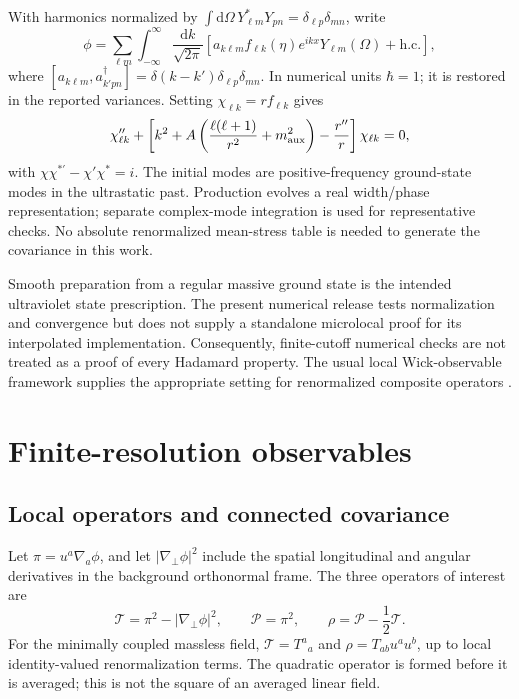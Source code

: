 \documentclass[aps,prd,reprint,floatfix,nofootinbib,longbibliography]{revtex4-2}
\newcommand{\dd}{\mathrm{d}}
\newcommand{\Tr}{\mathcal{T}}
\newcommand{\Pp}{\mathcal{P}}
\begin{document}
With harmonics normalized by $\int\dd\Omega\,Y_{\ell m}^*Y_{p n}=\delta_{\ell p}\delta_{mn}$, write
\begin{equation}
 \phi=\sum_{\ell m}\int_{-\infty}^{\infty}\frac{\dd k}{\sqrt{2\pi}}
 \left[a_{k\ell m} f_{\ell k}(\eta)e^{ikx}Y_{\ell m}(\Omega)+\mathrm{h.c.}\right],
 \label{eq:field}
\end{equation}
where $[a_{k\ell m},a_{k'pn}^\dagger]=\delta(k-k')\delta_{\ell p}\delta_{mn}$. In numerical units $\hbar=1$; it is restored in the reported variances. Setting $\chi_{\ell k}=r f_{\ell k}$ gives
\begin{equation}
 \chi_{\ell k}''+\left[k^2+A\left(\frac{\ell(\ell+1)}{r^2}+m_{\rm aux}^2\right)-\frac{r''}{r}\right]\chi_{\ell k}=0,
 \label{eq:mode}
\end{equation}
with $\chi\chi^{*\prime}-\chi'\chi^*=i$. The initial modes are positive-frequency ground-state modes in the ultrastatic past. Production evolves a real width/phase representation; separate complex-mode integration is used for representative checks. No absolute renormalized mean-stress table is needed to generate the covariance in this work.

Smooth preparation from a regular massive ground state is the intended ultraviolet state prescription. The present numerical release tests normalization and convergence but does not supply a standalone microlocal proof for its interpolated implementation. Consequently, finite-cutoff numerical checks are not treated as a proof of every Hadamard property. The usual local Wick-observable framework supplies the appropriate setting for renormalized composite operators \cite{HollandsWald2001}.

\section{Finite-resolution observables}
\subsection{Local operators and connected covariance}
Let $\pi=u^a\nabla_a\phi$, and let $|\nabla_\perp\phi|^2$ include the spatial longitudinal and angular derivatives in the background orthonormal frame. The three operators of interest are
\begin{equation}
 \Tr=\pi^2-|\nabla_\perp\phi|^2,\qquad
 \Pp=\pi^2,\qquad \rho=\Pp-\frac12\Tr.
 \label{eq:operators}
\end{equation}
For the minimally coupled massless field, $\Tr=T^a{}_a$ and $\rho=T_{ab}u^a u^b$, up to local identity-valued renormalization terms. The quadratic operator is formed before it is averaged; this is not the square of an averaged linear field.
\end{document}
